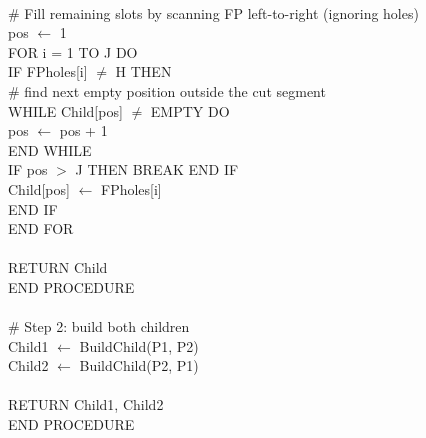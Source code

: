 \documentclass[10pt,twocolumn]{article}
\begin{document}
{\\
\hspace*{10pt}\# Fill remaining slots by scanning FP left-to-right (ignoring holes)\\
\hspace*{10pt}pos $\leftarrow$ 1\\
\hspace*{10pt}FOR i = 1 TO J DO\\
\hspace*{15pt}IF FPholes[i] $\neq$ H THEN\\
\hspace*{20pt}\# find next empty position outside the cut segment\\
\hspace*{20pt}WHILE Child[pos] $\neq$ EMPTY DO\\
\hspace*{25pt}pos $\leftarrow$ pos + 1\\
\hspace*{20pt}END WHILE\\
\hspace*{20pt}IF pos $>$ J THEN BREAK END IF\\
\hspace*{20pt}Child[pos] $\leftarrow$ FPholes[i]\\
\hspace*{15pt}END IF\\
\hspace*{10pt}END FOR\\
\\
\hspace*{10pt}RETURN Child\\
\hspace*{5pt}END PROCEDURE\\
\\
\hspace*{5pt}\# Step 2: build both children\\
\hspace*{5pt}Child1 $\leftarrow$ BuildChild(P1, P2)\\
\hspace*{5pt}Child2 $\leftarrow$ BuildChild(P2, P1)\\
\\
\hspace*{5pt}RETURN Child1, Child2\\
END PROCEDURE
}



\vspace{-6pt}

\end{document}

